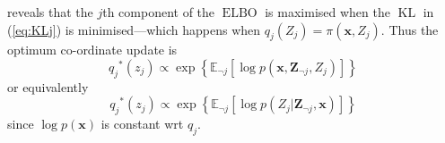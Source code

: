 \documentclass[11pt]{article}
\DeclareMathOperator{\KL}{KL}
\DeclareMathOperator{\ELBO}{ELBO}
\newcommand{\Eneg}[2]{\ensuremath{\mathbb E_{\neg #1}\left[ #2 \right]}}
\newcommand{\x}{\ensuremath{\mathbf x}}
\newcommand{\zj}{\ensuremath{z_{j}}}
\newcommand{\Zj}{\ensuremath{Z_{j}}}
\newcommand{\Znj}{\ensuremath{\mathbf Z_{\neg j}}}
\newcommand{\qj}{\ensuremath{q_{j}}}
\begin{document}
reveals that the $j$th component of the $\ELBO$ is maximised when the $\KL$ in (\ref{eq:KLj}) is minimised---which happens when $\qj(\Zj) = \pi(\x, \Zj)$. 
Thus the optimum co-ordinate update is
\begin{equation}
\qj^*(\zj) \propto \exp\left\{ \Eneg{j}{ \log p(\x, \Znj, \Zj)} \right\} 
\end{equation}
or equivalently 
\begin{equation}
\qj^*(\zj) \propto \exp\left\{ \Eneg{j}{ \log p(\Zj| \Znj, \x)} \right\}
\end{equation}
since $\log p(\x)$ is constant wrt $\qj$.






\end{document}
